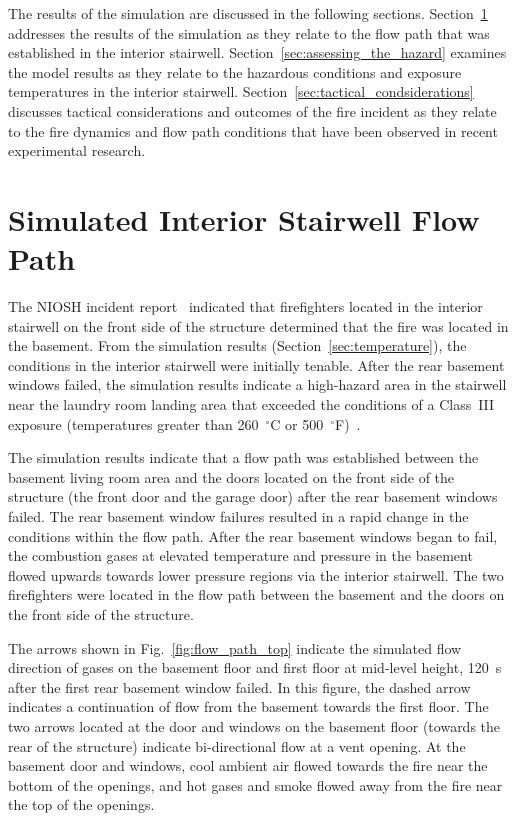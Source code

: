 \documentclass[12pt,oneside]{book}
\begin{document}
The results of the simulation are discussed in the following sections. Section~\ref{sec:simulated_flow_path} addresses the results of the simulation as they relate to the flow path that was established in the interior stairwell. Section~\ref{sec:assessing_the_hazard} examines the model results as they relate to the hazardous conditions and exposure temperatures in the interior stairwell. Section~\ref{sec:tactical_condsiderations} discusses tactical considerations and outcomes of the fire incident as they relate to the fire dynamics and flow path conditions that have been observed in recent experimental research.

\section{Simulated Interior Stairwell Flow Path}
\label{sec:simulated_flow_path}

The NIOSH incident report~\cite{NIOSH:Bowyer2} indicated that firefighters located in the interior stairwell on the front side of the structure determined that the fire was located in the basement. From the simulation results (Section~\ref{sec:temperature}), the conditions in the interior stairwell were initially tenable. After the rear basement windows failed, the simulation results indicate a high-hazard area in the stairwell near the laundry room landing area that exceeded the conditions of a Class~III exposure (temperatures greater than 260~$^{\circ}$C or 500~$^{\circ}$F)~\cite{Donnelly2006}.

The simulation results indicate that a flow path was established between the basement living room area and the doors located on the front side of the structure (the front door and the garage door) after the rear basement windows failed. The rear basement window failures resulted in a rapid change in the conditions within the flow path. After the rear basement windows began to fail, the combustion gases at elevated temperature and pressure in the basement flowed upwards towards lower pressure regions via the interior stairwell. The two firefighters were located in the flow path between the basement and the doors on the front side of the structure.

The arrows shown in Fig.~\ref{fig:flow_path_top} indicate the simulated flow direction of gases on the basement floor and first floor at mid-level height, 120~s after the first rear basement window failed. In this figure, the dashed arrow indicates a continuation of flow from the basement towards the first floor. The two arrows located at the door and windows on the basement floor (towards the rear of the structure) indicate bi-directional flow at a vent opening. At the basement door and windows, cool ambient air flowed towards the fire near the bottom of the openings, and hot gases and smoke flowed away from the fire near the top of the openings.
\end{document}
